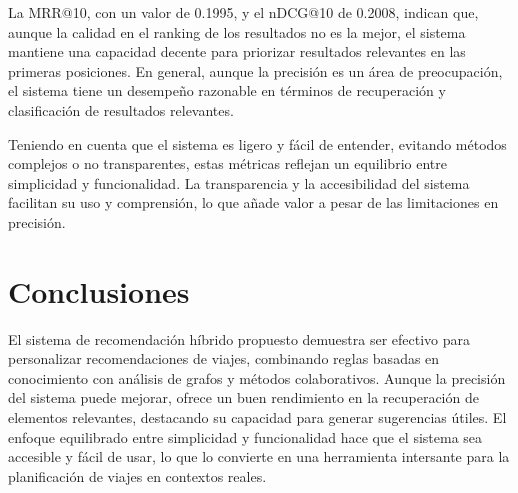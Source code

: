 \documentclass[runningheads]{llncs}
\begin{document}
La MRR@10, con un valor de 0.1995, y el nDCG@10 de 0.2008, indican que, aunque la calidad en el ranking de los resultados no es la mejor, el sistema mantiene una capacidad decente para priorizar resultados relevantes en las primeras posiciones. En general, aunque la precisión es un área de preocupación, el sistema tiene un desempeño razonable en términos de recuperación y clasificación de resultados relevantes.

Teniendo en cuenta que el sistema es ligero y fácil de entender, evitando métodos complejos o no transparentes, estas métricas reflejan un equilibrio entre simplicidad y funcionalidad. La transparencia y la accesibilidad del sistema facilitan su uso y comprensión, lo que añade valor a pesar de las limitaciones en precisión.

\section{Conclusiones}
El sistema de recomendación híbrido propuesto demuestra ser efectivo para personalizar recomendaciones de viajes, combinando reglas basadas en conocimiento con análisis de grafos y métodos colaborativos. Aunque la precisión del sistema puede mejorar, ofrece un buen rendimiento en la recuperación de elementos relevantes, destacando su capacidad para generar sugerencias útiles. El enfoque equilibrado entre simplicidad y funcionalidad hace que el sistema sea accesible y fácil de usar, lo que lo convierte en una herramienta intersante para la planificación de viajes en contextos reales.
\end{document}
